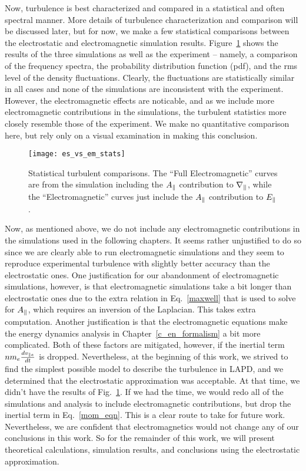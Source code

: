 Now, turbulence is best characterized and compared in a statistical and often spectral manner. 
More details of turbulence characterization and comparison will be discussed later, but for now, we make a few statistical comparisons between the electrostatic and electromagnetic simulation results.
Figure~\ref{es_vs_em_stats} shows the results of the three simulations as well as the experiment
 -- namely, a comparison of the frequency spectra, the probability distribution function (pdf), and the rms level of the density fluctuations. 
Clearly, the fluctuations are statistically similar in all cases and none of the simulations are inconsistent with the experiment. 
However, the electromagnetic effects are noticable, and as we include more electromagnetic contributions in the simulations, the turbulent statistics more closely resemble those of the experiment.
We make no quantitative comparison here, but rely only on a visual examination in making this conclusion.

\begin{figure}[!htbp]
\texttt{[image: es\_vs\_em\_stats]}
\hfil
\caption{Statistical turbulent comparisons. The ``Full Electromagnetic'' curves are from the simulation including the $A_\parallel$ contribution to $\nabla_\parallel$, while the ``Electromagnetic'' curves
just include the $A_\parallel$ contribution to $E_\parallel$.}
\label{es_vs_em_stats}
\end{figure}

Now, as mentioned above, we do not include any electromagnetic contributions in the simulations used in the following chapters. 
It seems rather unjustified to do so since we are clearly able to run electromagnetic simulations and they seem to reproduce experimental turbulence with slightly better accuracy 
than the electrostatic ones.
One justification for our abandonment of electromagnetic simulations, however, is that electromagnetic simulations take a bit longer than electrostatic ones due to the extra relation in Eq.~\ref{maxwell} 
that is used to solve for $A_\parallel$, which requires an inversion of the Laplacian. This takes extra computation. 
Another justification is that the electromagnetic equations make the energy dynamics analysis in Chapter~\ref{c_en_formalism} a bit more complicated. Both of these factors are mitigated, 
however, if the inertial term $n m_e \frac{dv_{\parallel e}}{dt}$ is dropped. Nevertheless, at the beginning of this work, we strived to find the simplest possible model to describe the turbulence in LAPD,
and we determined that the electrostatic approximation was acceptable. At that time, we didn't have the results of Fig.~\ref{es_vs_em_stats}. If we had the time, we would redo all of the simulations
and analysis to include electromagnetic contributions, but drop the inertial term in Eq.~\ref{mom_eqn}. This is a clear route to take for future work. 
Nevertheless, we are confident that electromagnetics would not change any of our conclusions in this work.
So for the remainder of this work, we will present theoretical calculations, simulation results, and conclusions using the electrostatic approximation.
